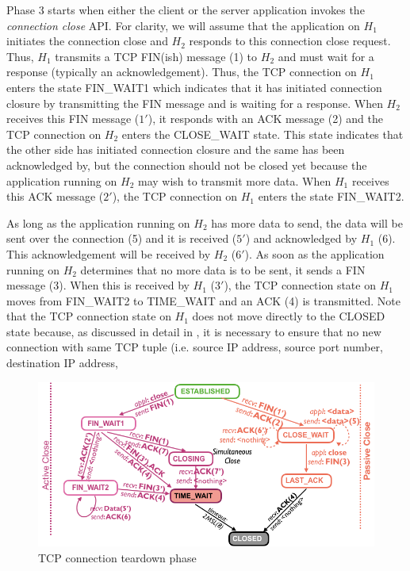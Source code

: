 \begin{multicols}{2}
Phase 3 starts when either the client or the server application invokes the \textit{connection close} API. For clarity, we will assume that the application on $H_{1}$ initiates the connection close and $H_{2}$ responds to this connection close request. Thus, $H_{1}$ transmits a TCP FIN(ish) message (1) to $H_{2}$ and must wait for a response (typically an acknowledgement). Thus, the TCP connection on $H_{1}$ enters the state FIN\_WAIT1 which indicates that it has initiated connection closure by transmitting the FIN message and is waiting for a response. When $H_{2}$ receives this FIN message ($1'$), it responds with an ACK message (2) and the TCP connection on $H_{2}$ enters the CLOSE\_WAIT state. This state indicates that the other side has initiated connection closure and the same has been acknowledged by, but the connection should not be closed yet because the application running on $H_{2}$ may wish to transmit more data. When $H_{1}$ receives this ACK message ($2'$), the TCP connection on $H_{1}$ enters the state FIN\_WAIT2.


{\parfillskip=0pt
As long as the application running on $H_{2}$ has more data to send, the data will be sent over the connection (5) and it is received ($5'$) and acknowledged by $H_{1}$ (6). This acknowledgement will be received by $H_{2}$ ($6'$). As soon as the application running on $H_{2}$ determines that no more data is to be sent, it sends a FIN message (3). When this is received by $H_{1}$ ($3'$), the TCP connection state on $H_{1}$ moves from FIN\_WAIT2 to TIME\_WAIT and an ACK (4) is transmitted. Note that the TCP connection state on $H_{1}$ does not move directly to the CLOSED state because, as discussed in detail in \cite{chap3-key8}, it is necessary to ensure that no new connection with same TCP tuple (i.e. source IP address, source port number, destination IP address,\par}
\end{multicols}

\begin{figure}[!htb]
\centering
\includegraphics[scale=.55]{src/Figures/chap3/2.jpg}
\caption{TCP connection teardown phase}\label{chap3-fig2}
\end{figure}

